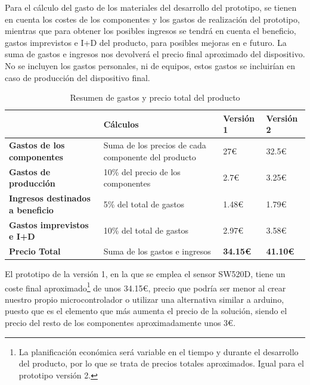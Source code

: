 Para el cálculo del gasto de los materiales del desarrollo del prototipo, se tienen en cuenta los costes de los componentes y los gastos de realización del prototipo, mientras que para obtener los posibles ingresos se tendrá en cuenta el beneficio, gastos imprevistos e I+D del producto, para posibles mejoras en e futuro. La suma de gastos e ingresos nos devolverá el precio final aproximado del dispositivo. No se incluyen los gastos personales, ni de equipos, estos gastos se incluirían en caso de producción del dispositivo final.


\begin{table}[h!]
\centering
\begin{tabular}{ |m{4cm}|m{4cm}|m{2cm}|m{2cm}|  } 
\hline
\cellcolor[HTML]{B9E3F0}\textbf{} & \cellcolor[HTML]{B9E3F0}\textbf{Cálculos} & \cellcolor[HTML]{B9E3F0}\textbf{Versión 1}& \cellcolor[HTML]{B9E3F0}\textbf{Versión 2}\\

\hline
\cellcolor[HTML]{EFEFEF}\textbf{Gastos de los componentes}             & {Suma de los precios de cada componente del producto}   & 27€ & 32.5€\\
\hline
\cellcolor[HTML]{EFEFEF}\textbf{Gastos de producción}                & {10\% del precio de los componentes} & 2.7€ & 3.25€\\
\hline
\cellcolor[HTML]{EFEFEF}\textbf{Ingresos destinados a beneficio}                & {5\% del total de gastos} & 1.48€ & 1.79€\\
\hline
\cellcolor[HTML]{EFEFEF}\textbf{Gastos imprevistos e I+D} & {10\% del total de gastos} & 2.97€ & 3.58€\\
\hline
\cellcolor[HTML]{EFEFEF}\textbf{Precio Total} & {Suma de los gastos e ingresos} & \textbf{34.15€} & \textbf{41.10€}\\
\hline
\end{tabular}
\caption{Resumen de gastos y precio total del producto}
\end{table}

El prototipo de la versión 1, en la que se emplea el sensor SW520D\cite{SW520D_1}, tiene un coste final aproximado\footnote{La planificación económica será variable en el tiempo y durante el desarrollo del producto, por lo que se trata de precios totales aproximados. Igual para el prototipo versión 2.} de unos 34.15€, precio que podría ser menor al crear nuestro propio microcontrolador o utilizar una alternativa similar a arduino, puesto que es el elemento que más aumenta el precio de la solución, siendo el precio del resto de los componentes aproximadamente unos 3€.

